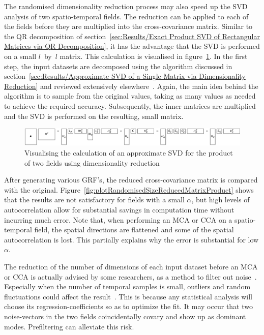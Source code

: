\documentclass[ijgi,article,submit,moreauthors,pdftex,10pt,a4paper]{Definitions/mdpi}
\begin{document}
The randomised dimensionality reduction process may also speed up the SVD analysis of two spatio-temporal fields. The reduction can be applied to each of the fields before they are multiplied into the cross-covariance matrix. Similar to the QR decomposition of section~\ref{sec:Results/Exact Product SVD of Rectangular Matrices via QR Decomposition}, it has the advantage that the SVD is performed on a small $l$~by~$l$ matrix. This calculation is visualised in figure~\ref{fig:randomisedSquareProductSVD}. In the first step, the input datasets are decomposed using the algorithm discussed in section~\ref{sec:Results/Approximate SVD of a Single Matrix via Dimensionality Reduction} and reviewed extensively elsewhere~\cite{Halko2011, Li2016}. Again, the main idea behind the algorithm is to sample from the original values, taking as many values as needed to achieve the required accuracy. Subsequently, the inner matrices are multiplied and the SVD is performed on the resulting, small matrix.

\begin{figure}[H]
\centering
\includegraphics[width=\textwidth]{Results/randomisedSquareProductSVD.pdf}
\caption[Approximate product SVD]{Visualising the calculation of an approximate SVD for the product of two fields using dimensionality reduction}
\label{fig:randomisedSquareProductSVD}
\end{figure}

After generating various GRF's, the reduced cross-covariance matrix is compared with the original. Figure~\ref{fig:plotRandomisedSizeReducedMatrixProduct} shows that the results are not satisfactory for fields with a small $\alpha$, but high levels of autocorrelation allow for substantial savings in computation time without incurring much error. Note that, when performing an MCA or CCA on a spatio-temporal field, the spatial directions are flattened and some of the spatial autocorrelation is lost. This partially explains why the error is substantial for low $\alpha$.

The reduction of the number of dimensions of each input dataset before an MCA or CCA is actually advised by some researchers, as a method to filter out noise~\cite{Barnett1987}. Especially when the number of temporal samples is small, outliers and random fluctuations could affect the result~\cite{Bretherton1992}. This is because any statistical analysis will choose its regression-coefficients so as to optimize the fit. It may occur that two noise-vectors in the two fields coincidentally covary and show up as dominant modes. Prefiltering can alleviate this risk.
\end{document}

